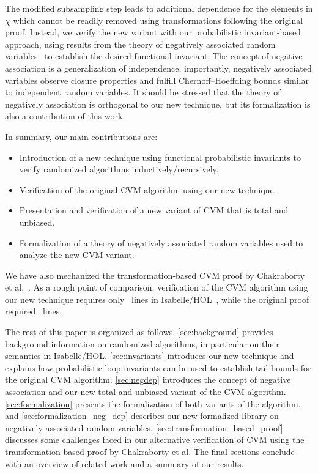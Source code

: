 The modified subsampling step leads to additional dependence for the elements in $\chi$ which cannot be readily removed using transformations following the original proof.
Instead, we verify the new variant with our probabilistic invariant-based approach, using results from the theory of negatively associated random variables~\cite{joagdev1983} to establish the desired functional invariant.
The concept of negative association is a generalization of independence; importantly, negatively associated variables observe closure properties and fulfill Chernoff--Hoeffding bounds similar to independent random variables.
It should be stressed that the theory of negatively association is orthogonal to our new technique, but its formalization is also a contribution of this work.

In summary, our main contributions are:
\begin{itemize}
\item Introduction of a new technique using functional probabilistic invariants to verify randomized algorithms inductively/recursively.
\item Verification of the original CVM algorithm using our new technique.
\item Presentation and verification of a new variant of CVM that is total and unbiased.
\item Formalization of a theory of negatively associated random variables used to analyze the new CVM variant.
\end{itemize}

We have also mechanized the transformation-based CVM proof by Chakraborty et al.~\cite{chakraborty2022,chakraborty2023}.
As a rough point of comparison, verification of the CVM algorithm using our new technique requires only \locnew~lines in Isabelle/HOL~\cite{nipkow2002}, while the original proof required \locold~lines.

The rest of this paper is organized as follows.
\cref{sec:background} provides background information on randomized algorithms, in particular on their semantics in Isabelle/HOL.
\cref{sec:invariants} introduces our new technique and explains how probabilistic loop invariants can be used to establish tail bounds for the original CVM algorithm.
\cref{sec:negdep} introduces the concept of negative association and our new total and unbiased variant of the CVM algorithm.
\cref{sec:formalization} presents the formalization of both variants of the algorithm, and \cref{sec:formalization_neg_dep} describes our new formalized library on negatively associated random variables.
\cref{sec:transformation_based_proof} discusses some challenges faced in our alternative verification of CVM using the transformation-based proof by Chakraborty et al.
The final sections conclude with an overview of related work and a summary of our results.


